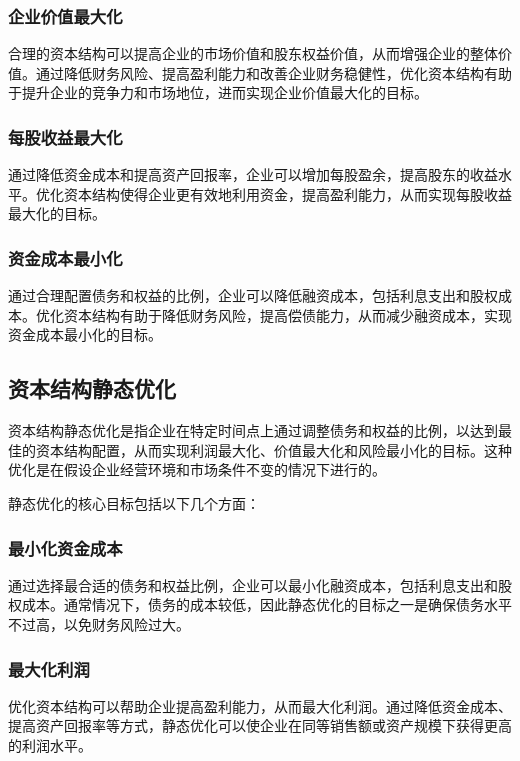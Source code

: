 \subsubsection{企业价值最大化}
合理的资本结构可以提高企业的市场价值和股东权益价值，从而增强企业的整体价值。通过降低财务风险、提高盈利能力和改善企业财务稳健性，优化资本结构有助于提升企业的竞争力和市场地位，进而实现企业价值最大化的目标。
\subsubsection{每股收益最大化}
通过降低资金成本和提高资产回报率，企业可以增加每股盈余，提高股东的收益水平。优化资本结构使得企业更有效地利用资金，提高盈利能力，从而实现每股收益最大化的目标。
\subsubsection{资金成本最小化}
通过合理配置债务和权益的比例，企业可以降低融资成本，包括利息支出和股权成本。优化资本结构有助于降低财务风险，提高偿债能力，从而减少融资成本，实现资金成本最小化的目标。
\subsection{资本结构静态优化}
资本结构静态优化是指企业在特定时间点上通过调整债务和权益的比例，以达到最佳的资本结构配置，从而实现利润最大化、价值最大化和风险最小化的目标。这种优化是在假设企业经营环境和市场条件不变的情况下进行的。

静态优化的核心目标包括以下几个方面：

\subsubsection{最小化资金成本}

通过选择最合适的债务和权益比例，企业可以最小化融资成本，包括利息支出和股权成本。通常情况下，债务的成本较低，因此静态优化的目标之一是确保债务水平不过高，以免财务风险过大。
\subsubsection{最大化利润}
优化资本结构可以帮助企业提高盈利能力，从而最大化利润。通过降低资金成本、提高资产回报率等方式，静态优化可以使企业在同等销售额或资产规模下获得更高的利润水平。
